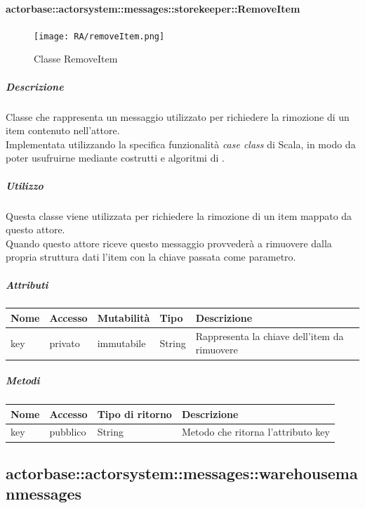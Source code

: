 \documentclass{scalatekids-article}
\begin{document}
\paragraph{actorbase::actorsystem::messages::storekeeper::RemoveItem}
\label{sec:actorbase::actorsystem::messages::storekeeper::RemoveItem}

\begin{figure}[H]
  \begin{center}
    \texttt{[image: RA/removeItem.png]}
    \caption{Classe RemoveItem}
  \end{center}
\end{figure}

\subparagraph{Descrizione}
Classe che rappresenta un messaggio utilizzato per richiedere la rimozione di un
item contenuto nell'attore.\\Implementata utilizzando la specifica funzionalità
\textit{case class} di Scala,
in modo da poter usufruirne mediante costrutti e algoritmi di
.

\subparagraph{Utilizzo}
Questa classe viene utilizzata per richiedere la rimozione di un
item mappato da questo attore.\\Quando questo attore riceve questo
messaggio provvederà a rimuovere dalla propria struttura dati l'item con la
chiave passata come parametro.

\subparagraph{Attributi}
\begin{tabular}{| p{2cm} | p{1.5cm} | p{2cm} | p{3cm} | p{8.5cm} |}
  \hline
  Nome & Accesso & Mutabilità & Tipo & Descrizione\\
  \hline
  key & privato & immutabile & String & Rappresenta la chiave dell'item da rimuovere\\
  \hline
\end{tabular}

\subparagraph{Metodi}
\begin{tabular}{| p{3cm} | p{1.5cm} | p{3.5cm} | p{9cm} |}
  \hline
  Nome & Accesso & Tipo di ritorno & Descrizione\\
  \hline
  key & pubblico & String & Metodo che ritorna l'attributo key\\
  \hline
\end{tabular}


\subsection{actorbase::actorsystem::messages::warehousemanmessages}
\label{sec:actorbase::actorsystem::messages::warehousemanmessages}
\end{document}
